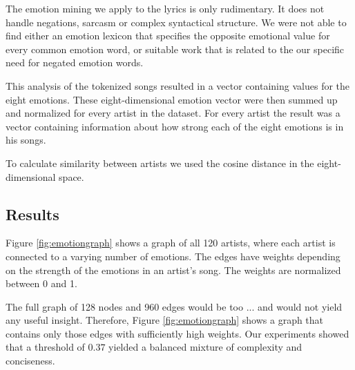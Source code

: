 \documentclass[10pt,a4paper]{article}
\begin{document}
	The emotion mining we apply to the lyrics is only rudimentary. It does not handle negations, sarcasm or complex syntactical structure. We were not able to find either an emotion lexicon that specifies the opposite emotional value for every common emotion word, or suitable work that is related to the our specific need for negated emotion words.
	
	This analysis of the tokenized songs resulted in a vector containing values for the eight emotions. These eight-dimensional emotion vector were then summed up and normalized for every artist in the dataset. For every artist the result was a vector containing information about how strong each of the eight emotions is in his songs.
	
	To calculate similarity between artists we used the cosine distance in the eight-dimensional space.
	
		\subsection{Results}
		Figure \ref{fig:emotiongraph} shows a graph of all 120 artists, where each artist is connected to a varying number of emotions. The edges have weights depending on the strength of the emotions in an artist's song. The weights are normalized between 0 and 1.
		
		The full graph of 128 nodes and 960 edges would be too ... and would not yield any useful insight. Therefore, Figure \ref{fig:emotiongraph} shows a graph that contains only those edges with sufficiently high weights. Our experiments showed that a threshold of $0.37$ yielded a balanced mixture of complexity and conciseness.
		
\end{document}
